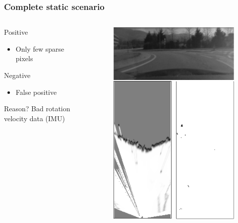 \documentclass{beamer}
\begin{document}
	\begin{frame}
		\frametitle{Complete static scenario}
		
		\begin{columns}[t]
			\begin{column}[t]{5cm}
				\begin{exampleblock}{Positive}
				\begin{itemize}
				\item Only few sparse pixels
				\end{itemize}
				\end{exampleblock}
								
				\begin{alertblock}{Negative}
				\begin{itemize}
				\item False positive
				\end{itemize}
				\end{alertblock}					
		
				\begin{block}{Reason?}
				Bad rotation velocity data (IMU)
				\end{block}					
			\end{column}
			\begin{column}[t]{5cm}
				\begin{figure}[h]
				\center
				\includegraphics[scale=0.55]{../img/fig:result:scenestatic}
				\end{figure}
			\end{column}
		\end{columns}
	\end{frame}			
\end{document}
